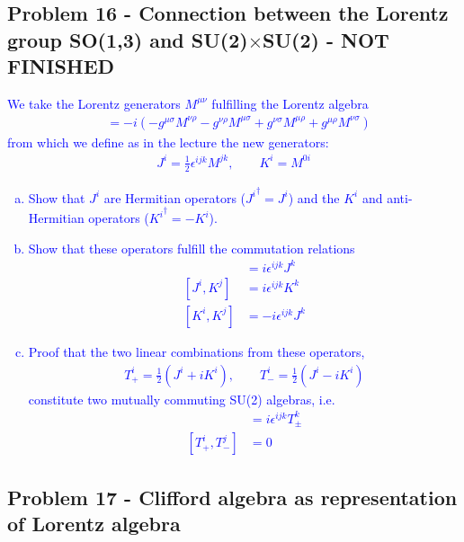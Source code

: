 \documentclass[../main.tex]{subfiles}
\begin{document}
\subsection{Problem 16 - Connection between the Lorentz group SO(1,3) and SU(2)$\times$SU(2) - NOT FINISHED}

\textcolor{blue}{
We take the Lorentz generators $M^{\mu\nu}$ fulfilling the Lorentz algebra
\begin{align}
[M^{\mu\nu},M^{\rho\sigma}]&=-i(-
g^{\mu\sigma}M^{\nu\rho}-
g^{\nu\rho}M^{\mu\sigma}+
g^{\nu\sigma}M^{\mu\rho}+
g^{\mu\rho}M^{\nu\sigma}
)
\end{align}
from which we define as in the lecture the new generators:
\begin{align}
J^i=\frac{1}{2}\epsilon^{ijk}M^{jk},\qquad K^i=M^{0i}
\end{align}
\begin{enumerate}[(a)]
\item Show that $J^i$ are Hermitian operators (${J^i}^\dagger=J^i$) and the $K^i$ and anti-Hermitian operators (${K^i}^\dagger=-K^i$).
\item Show that these operators fulfill the commutation relations
\begin{align}
[J^i,J^j]&=i\epsilon^{ijk}J^k\\
[J^i,K^j]&=i\epsilon^{ijk}K^k\\
[K^i,K^j]&=-i\epsilon^{ijk}J^k
\end{align}
\item Proof that the two linear combinations from these operators,
\begin{align}
T^i_+=\frac{1}{2}(J^i+iK^i),\qquad T^i_-=\frac{1}{2}(J^i-iK^i)
\end{align}
constitute two mutually commuting SU(2) algebras, i.e.
\begin{align}
[T^i_\pm,T^j_\pm]&=i\epsilon^{ijk}T^k_\pm\\
[T^i_+,T^j_-]&=0
\end{align}
\end{enumerate}
}

\subsection{Problem 17 - Clifford algebra as representation of Lorentz algebra}
\end{document}
